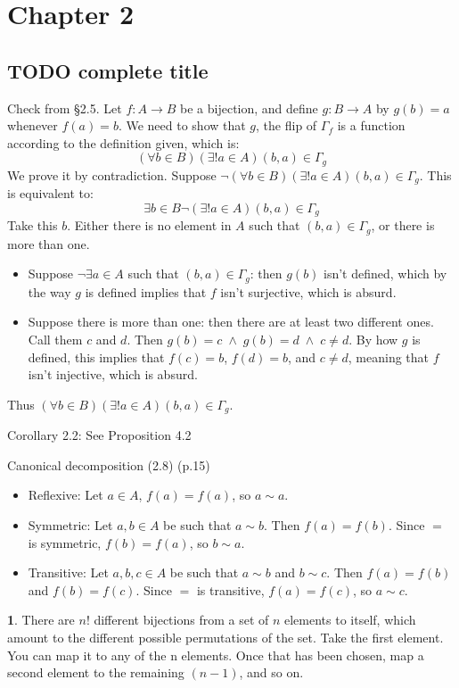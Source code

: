 \documentclass{article}
\theoremstyle{definition}
\newcommand{\AND}{\;\wedge\;}
\theoremstyle{definition}
\theoremstyle{definition}
\newtheorem{solution-internal}{}[subsection]
\newenvironment{solution}{
  \medskip
  \begin{solution-internal}
}{
  \end{solution-internal}
}
\begin{document}
\section*{Chapter 2}
\subsection*{TODO complete title}
\setcounter{subsection}{2}
\setcounter{solution-internal}{0}

Check from \S 2.5.
Let $f \colon A \to B$ be a bijection, and define $g \colon B \to A$ by $g(b)=a$ whenever $f(a)=b$. We need to show that $g$, the flip of $\Gamma_f$ is a
function according to the definition given, which is: 
\[ (\forall b \in B)(\exists! a \in A) (b,a) \in \Gamma_g \]
We prove it by contradiction. Suppose $\neg (\forall b \in B)(\exists! a \in A)
(b,a) \in \Gamma_g$. This is equivalent to:
\[ \exists b \in B \neg (\exists! a \in A) (b,a) \in \Gamma_g \]
Take this $b$. Either there is no element in $A$ such that $(b,a) \in \Gamma_g$, or there is more than one.
\begin{itemize}
\item Suppose $\neg \exists a \in A$ such that $(b,a) \in \Gamma_g$: then
$g(b)$ isn't defined, which by the way $g$ is defined implies that $f$ isn't
surjective, which is absurd.
\item Suppose there is more than one: then there are at least two different ones. Call them $c$ and $d$. Then $g(b) = c \AND g(b) = d \AND c \neq d$. By how $g$ is defined, this implies that $f(c) = b$, $f(d) = b$, and $c \neq d$, meaning that $f$ isn't injective, which is absurd.
\end{itemize}
Thus $(\forall b \in B)(\exists! a \in A) (b,a) \in \Gamma_g$.

Corollary 2.2: See Proposition 4.2

Canonical decomposition (2.8) (p.15)
\begin{itemize}
\item Reflexive: Let $a \in A$, $f(a) = f(a)$, so $a \sim a$.
\item Symmetric: Let $a, b \in A$ be such that $a \sim b$. Then $f(a) = f(b)$. Since $=$ is symmetric, $f(b) = f(a)$, so $b \sim a$.
\item Transitive: Let $a, b, c \in A$ be such that $a \sim b$ and $b \sim c$. Then $f(a) = f(b)$ and $f(b) = f(c)$. Since $=$ is transitive, $f(a) = f(c)$, so $a \sim c$.
\end{itemize}


\begin{solution}
There are $n!$ different bijections from a set of $n$ elements to itself, which
amount to the different possible permutations of the set. Take the first
element. You can map it to any of the n elements. Once that has been chosen,
map a second element to the remaining $(n-1)$, and so on.
\end{solution}
\end{document}
